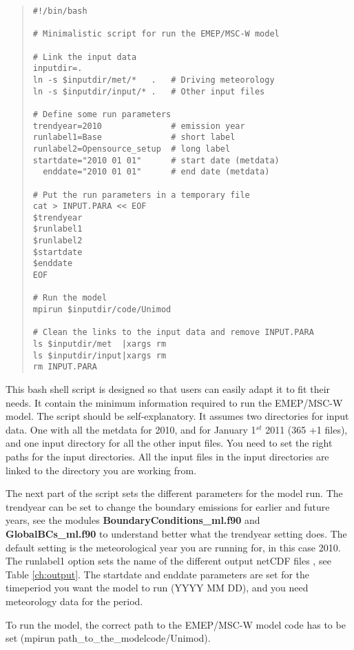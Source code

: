 \begin{quote}
\begin{verbatim}
#!/bin/bash

# Minimalistic script for run the EMEP/MSC-W model

# Link the input data
inputdir=.
ln -s $inputdir/met/*   .   # Driving meteorology
ln -s $inputdir/input/* .   # Other input files

# Define some run parameters
trendyear=2010              # emission year
runlabel1=Base              # short label
runlabel2=Opensource_setup  # long label
startdate="2010 01 01"      # start date (metdata)
  enddate="2010 01 01"      # end date (metdata)

# Put the run parameters in a temporary file
cat > INPUT.PARA << EOF
$trendyear
$runlabel1
$runlabel2
$startdate
$enddate
EOF

# Run the model
mpirun $inputdir/code/Unimod

# Clean the links to the input data and remove INPUT.PARA
ls $inputdir/met  |xargs rm
ls $inputdir/input|xargs rm
rm INPUT.PARA

\end{verbatim}
\end{quote}
This bash shell script is designed so that users can easily 
adapt it to fit their needs. It contain the minimum information 
required to run the EMEP/MSC-W model. 
The script should be self-explanatory. It assumes two directories for input data. 
One with all the metdata for 2010, and for January 1$^{st}$ 2011 (365 +1 files), 
and one input directory for all the other input files. You need to set the right paths 
for the input directories.  
All the input files in the input directories are linked to the directory you are working from. 
  

The next part of the script sets the different parameters for the model run. 
The trendyear can be set to change the boundary emissions for 
earlier and future years, see the modules {\bf BoundaryConditions\_ml.f90 } 
and {\bf GlobalBCs\_ml.f90 } to understand better what the trendyear 
setting does. The default setting is the meteorological year you are running for, 
in this case 2010. 
The runlabel1 option sets the name of the different output netCDF 
files , see Table \ref{ch:output}. 
The startdate and enddate parameters are set for the timeperiod you want the model 
to run (YYYY MM DD), and you need meteorology data for the period.

To run the model, the correct path to the EMEP/MSC-W model code 
has to be set (mpirun path\_to\_the\_modelcode/Unimod).  


